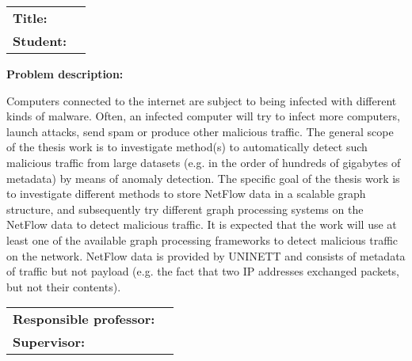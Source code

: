 \begin{titlingpage}

\noindent
\begin{tabular}{@{}p{4cm}l}
\textbf{Title:} 	& \thetitle \\
\textbf{Student:}	& \theauthor \\
\end{tabular}

\vspace{4ex}
\noindent\textbf{Problem description:}
\vspace{2ex}

\noindent 
Computers connected to the internet are subject to being infected with different kinds of malware.
Often, an infected computer will try to infect more computers, launch attacks, send spam or produce other malicious traffic.
The general scope of the thesis work is to investigate method(s) to automatically detect such malicious traffic from large datasets (e.g. in the order of hundreds of gigabytes of metadata) by means of anomaly detection.
The specific goal of the thesis work is to investigate different methods to store NetFlow data in a scalable graph structure, and subsequently try different graph processing systems on the NetFlow data to detect malicious traffic.
It is expected that the work will use at least one of the available graph processing frameworks to detect malicious traffic on the network.
NetFlow data is provided by UNINETT and consists of metadata of traffic but not payload (e.g. the fact that two IP addresses exchanged packets, but not their contents).

\vspace{6ex}

\noindent
\begin{tabular}{@{}p{4cm}l}
\textbf{Responsible professor:} 	& \theprofessor \\
\textbf{Supervisor:}			& \thesupervisor \\
\end{tabular}

\end{titlingpage}
